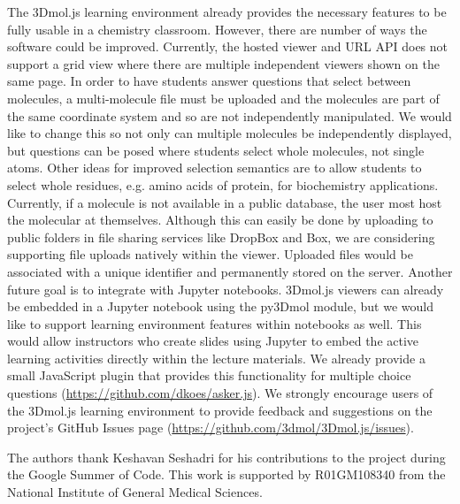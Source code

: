 \documentclass[journal=jceda8,manuscript=article]{achemso}
\begin{document}
The 3Dmol.js learning environment already provides the necessary features to be fully usable in a chemistry classroom.  However, there are number of ways the software could be improved.  Currently, the hosted viewer and URL API does not support a grid view where there are multiple independent viewers shown on the same page.  In order to have students answer questions that select between molecules, a multi-molecule file must be uploaded and the molecules are part of the same coordinate system and so are not independently manipulated.  We would like to change this so not only can multiple molecules be independently displayed, but questions can be posed where students select whole molecules, not single atoms.  Other ideas for improved selection semantics are to allow students to select whole residues, e.g. amino acids of protein, for biochemistry applications.  Currently, if a molecule is not available in a public database, the user most host the molecular at themselves.  Although this can easily be done by uploading to public folders in file sharing services like DropBox and Box, we are considering supporting file uploads natively within the viewer.  Uploaded files would be associated with a unique identifier and permanently stored on the server.  Another future goal is to integrate with Jupyter notebooks.  3Dmol.js viewers can already be embedded in a Jupyter notebook using the py3Dmol module, but we would like to support learning environment features within notebooks as well.  This would allow instructors who create slides using Jupyter to embed the active learning activities directly within the lecture materials. We already provide a small JavaScript plugin that provides this functionality for multiple choice questions (\url{https://github.com/dkoes/asker.js}).  
 We strongly encourage users of the 3Dmol.js learning environment to provide feedback and suggestions on the project's GitHub Issues page (\url{https://github.com/3dmol/3Dmol.js/issues}).
 


\begin{acknowledgement}



The authors thank Keshavan Seshadri for his contributions to the project during the Google Summer of Code.
  This work is supported by R01GM108340 from the National Institute of General Medical Sciences.

\end{acknowledgement}
\end{document}
